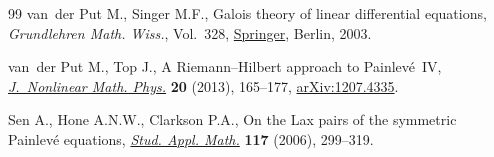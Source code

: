 \documentclass[pdftex]{sigma}
\numberwithin{equation}{section}
\begin{document}
\begin{thebibliography}{99}
van~der Put M., Singer M.F., Galois theory of linear differential equations,
 \textit{Grundlehren Math. Wiss.}, Vol.~328,
 \href{https://doi.org/10.1007/978-3-642-55750-7}{Springer}, Berlin, 2003.

van~der Put M., Top J., A {R}iemann--{H}ilbert approach to {P}ainlev\'e~{IV},
 \href{https://doi.org/10.1080/14029251.2013.862442}{\textit{J.~Nonlinear
 Math. Phys.}} \textbf{20} (2013), 165--177,
 \href{http://arxiv.org/abs/1207.4335}{arXiv:1207.4335}.

Sen A., Hone A.N.W., Clarkson P.A., On the {L}ax pairs of the symmetric
 {P}ainlev\'e equations,
 \href{https://doi.org/10.1111/j.1467-9590.2006.00356.x}{\textit{Stud. Appl.
 Math.}} \textbf{117} (2006), 299--319.


\end{thebibliography}\LastPageEnding
\end{document}
